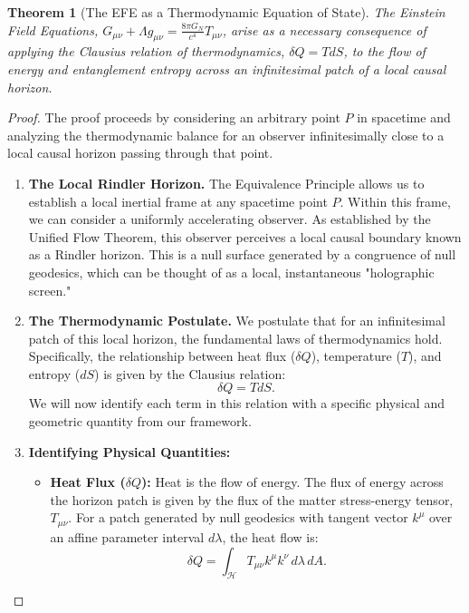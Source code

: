 \documentclass[11pt, letterpaper]{report}
\theoremstyle{plain} %
\newtheorem{theorem}{Theorem}[chapter]
\theoremstyle{definition} %
\theoremstyle{remark} %
\begin{document}
\begin{theorem}[The EFE as a Thermodynamic Equation of State]
\label{thm:efe_from_thermo}
The Einstein Field Equations, $G_{\mu\nu} + \Lambda g_{\mu\nu} = \frac{8\pi G_N}{c^4} T_{\mu\nu}$, arise as a necessary consequence of applying the Clausius relation of thermodynamics, $\delta Q = T dS$, to the flow of energy and entanglement entropy across an infinitesimal patch of a local causal horizon.
\end{theorem}
\begin{proof}
The proof proceeds by considering an arbitrary point $P$ in spacetime and analyzing the thermodynamic balance for an observer infinitesimally close to a local causal horizon passing through that point.

\begin{enumerate}
    \item \textbf{The Local Rindler Horizon.} The Equivalence Principle allows us to establish a local inertial frame at any spacetime point $P$. Within this frame, we can consider a uniformly accelerating observer. As established by the Unified Flow Theorem, this observer perceives a local causal boundary known as a Rindler horizon. This is a null surface generated by a congruence of null geodesics, which can be thought of as a local, instantaneous "holographic screen."

    \item \textbf{The Thermodynamic Postulate.} We postulate that for an infinitesimal patch of this local horizon, the fundamental laws of thermodynamics hold. Specifically, the relationship between heat flux ($\delta Q$), temperature ($T$), and entropy ($dS$) is given by the Clausius relation:
    \begin{equation}
        \delta Q = T dS.
        \label{eq:clausius_local_horizon}
    \end{equation}
    We will now identify each term in this relation with a specific physical and geometric quantity from our framework.

    \item \textbf{Identifying Physical Quantities:}
    \begin{itemize}
        \item \textbf{Heat Flux ($\delta Q$):} Heat is the flow of energy. The flux of energy across the horizon patch is given by the flux of the matter stress-energy tensor, $T_{\mu\nu}$. For a patch generated by null geodesics with tangent vector $k^\mu$ over an affine parameter interval $d\lambda$, the heat flow is:
        \begin{equation}
            \delta Q = \int_{\mathcal{H}} T_{\mu\nu} k^\mu k^\nu \, d\lambda \, dA.
        \end{equation}


\end{itemize}
\end{enumerate}
\end{proof}
\end{document}
